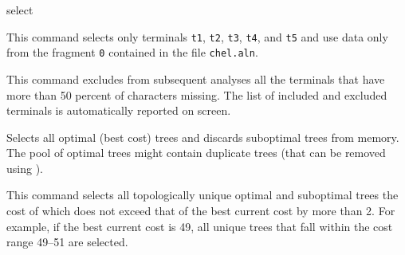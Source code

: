 \begin{command}{select}{}
	\begin{poyexamples}
        
        
            {This command selects only terminals \texttt{t1},  \texttt{t2},
             \texttt{t3},  \texttt{t4}, and  \texttt{t5} and use data only from the
              fragment  \texttt{0} contained in the file \texttt{chel.aln}.}
	
	{This command excludes from subsequent analyses all the terminals that
	have more than 50 percent of characters missing. The list of included and excluded
	terminals is automatically reported on screen.}
	
            {Selects all optimal (best cost) trees and discards suboptimal trees from
            memory. The pool of optimal trees might contain duplicate trees (that can
            be removed using ).}
            
	{This command selects all topologically unique optimal and suboptimal trees
	the cost of which does not exceed that of the best current cost by more than
	2. For example, if the best current cost is 49, all unique trees that fall within
	the cost range 49--51 are selected.}
	
	\end{poyexamples}

	\begin{poyalso}
	\end{poyalso}

\end{command}

   
